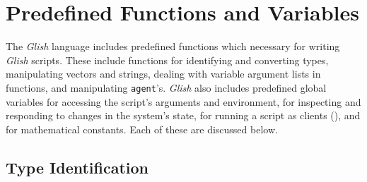 
\chapter{Predefined Functions and Variables}
\label{predefineds}

The {\em Glish} language includes predefined 
functions which necessary for
writing {\em Glish} scripts.  These include functions for identifying and
converting types, manipulating vectors and strings, 
dealing with variable argument lists in
functions, and manipulating {\tt agent}'s.  {\em Glish} 
also includes predefined
global variables for accessing the script's arguments and environment, for
inspecting and responding to changes in the system's state, for running
a script as clients (), and for mathematical constants.
Each of these are discussed below.

\section{Type Identification}
\label{predefineds-identification}

